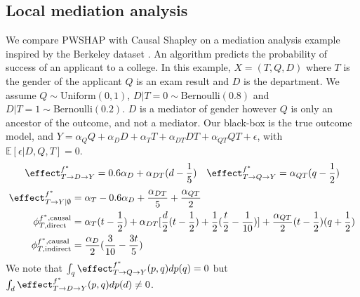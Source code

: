 \subsection{Local mediation analysis} \label{subsec:local_mediation}

We compare PWSHAP with Causal Shapley on a mediation analysis example inspired by the Berkeley dataset . An algorithm predicts the probability of success of an applicant to a college. In this example, $X=(T,Q,D)$ where $T$ is the gender of the applicant $Q$ is an exam result and $D$ is the department. We assume $Q \sim \text{Uniform}(0,1)$, $D | T=0 \sim \text{Bernoulli}(0.8)$ and $D | T=1 \sim \text{Bernoulli}(0.2)$. $D$ is a mediator of gender however $Q$ is only an ancestor of the outcome, and not a mediator. Our black-box is the true outcome model, and $Y = \alpha_Q Q + \alpha_D D + \alpha_T T + \alpha_{DT} DT + \alpha_{QT} QT + \epsilon$, with $\mathbb{E}[\epsilon | D, Q, T] = 0$.
\begin{align*}
    \effect^{f^*}_{T \rightarrow D \rightarrow Y} = 0.6 \alpha_D + \alpha_{DT} (d - \frac{1}{5})  & & \effect^{f^*}_{T \rightarrow Q \rightarrow Y} = \alpha_{QT}(q - \frac{1}{2}) 
\end{align*}
\begin{align*}
    \effect^{f^*}_{T \rightarrow Y | \emptyset} &= \alpha_T - 0.6 \alpha_D + \frac{\alpha_{DT}}{5} + \frac{\alpha_{QT}}{2}  \\
    \phi^{f^*,\text{causal}}_{T,\text{direct}} &= \alpha_T(t - \frac{1}{2}) + \alpha_{DT}[\frac{d}{2}(t - \frac{1}{2}) + \frac{1}{2}(\frac{t}{2} - \frac{1}{10})] + \frac{\alpha_{QT}}{2}(t - \frac{1}{2})(q + \frac{1}{2}) \\
    \phi^{f^*,\text{causal}}_{T,\text{indirect}} &= \frac{\alpha_D}{2}  (\frac{3}{10} - \frac{3t}{5}) \\
\end{align*}
We note that $\int_{q} \effect^{f^*}_{T \rightarrow Q \rightarrow Y}(p,q) dp(q) = 0$ but $\int_{d} \effect^{f^*}_{T \rightarrow D \rightarrow Y}(p,q) dp(d) \neq 0$.


